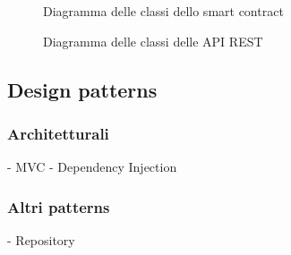 \begin{figure}[H]
    
    \caption{Diagramma delle classi dello smart contract}\label{fig:contract}
\end{figure}

\begin{figure}[H]
    
    \caption{Diagramma delle classi delle API REST}\label{fig:apirest}
\end{figure}

\subsection{Design patterns}

\subsubsection{Architetturali}
- MVC
- Dependency Injection

\subsubsection{Altri patterns}
- Repository
